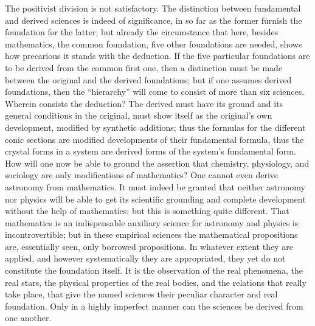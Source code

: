 \documentclass[12pt]{book}
\begin{document}
The positivist division is not satisfactory. The distinction between fundamental
and derived sciences is indeed of significance, in so far as the former furnish
the foundation for the latter; but already the circumstance that here, besides
mathematics, the common foundation, five other foundations are needed, shows how
precarious it stands with the deduction. If the five particular foundations are
to be derived from the common first one, then a distinction must be made between
the original and the derived foundations; but if one assumes derived foundations,
then the ``hierarchy'' will come to consist of more than six sciences. Wherein
consists the deduction? The derived must have its ground and its general
conditions in the original, must show itself as the original's own development,
modified by synthetic additions; thus the formulas for the different conic
sections are modified developments of their fundamental formula, thus the crystal
forms in a system are derived forms of the system's fundamental form. How will
one now be able to ground the assertion that chemistry, physiology, and sociology
are only modifications of mathematics? One cannot even derive astronomy from
mathematics. It must indeed be granted that neither astronomy nor physics will be
able to get its scientific grounding and complete development without the help of
mathematics; but this is something quite different. That mathematics is an
indispensable auxiliary science for astronomy and physics is incontrovertible;
but in these empirical sciences the mathematical propositions are, essentially
seen, only borrowed propositions. In whatever extent they are applied, and
however systematically they are appropriated, they yet do not constitute the
foundation itself. It is the observation of the real phenomena, the real stars,
the physical properties of the real bodies, and the relations that really take
place, that give the named sciences their peculiar character and real
foundation. Only in a highly imperfect manner can the sciences be derived from
one another.
\end{document}
